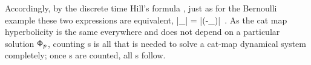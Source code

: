Accordingly, by the discrete time Hill's formula , just as
for the Bernoulli example  these two expressions are
equivalent,
\beq
|\Det\jMorb_\Mm| = |\det(\id-\jMat_\Mm)|
\,.
As the cat map hyperbolicity is the same everywhere and
does not depend on a particular solution $\mathsf{\Phi}_p$, counting \po s is all
that is needed to solve a cat-map dynamical system completely; once \po s
are counted, all {\cycForm s} follow.
